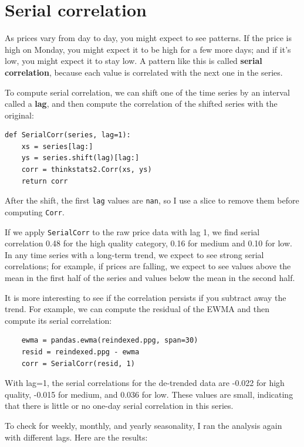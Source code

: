 \documentclass[12pt]{book}
\begin{document}
\section{Serial correlation}

As prices vary from day to day, you might expect to see patterns.
If the price is high on Monday,
you might expect it to be high for a few more days; and
if it's low, you might expect it to stay low.  A pattern
like this is called {\bf serial
correlation}, because each value is correlated with the next one
in the series.

To compute serial correlation, we can shift one of the time series
by an interval called a {\bf lag}, and then compute the correlation
of the shifted series with the original:

\begin{verbatim}
def SerialCorr(series, lag=1):
    xs = series[lag:]
    ys = series.shift(lag)[lag:]
    corr = thinkstats2.Corr(xs, ys)
    return corr
\end{verbatim}

After the shift, the first {\tt lag} values are {\tt nan}, so
I use a slice to remove them before computing {\tt Corr}.


If we apply {\tt SerialCorr} to the raw price data with lag 1, we find
serial correlation 0.48 for the high quality category, 0.16 for
medium and 0.10 for low.  In any time series with a long-term trend,
we expect to see strong serial correlations; for example, if prices
are falling, we expect to see values above the mean in the first
half of the series and values below the mean in the second half.

It is more interesting to see if the correlation persists if you
subtract away the trend.  For example, we can compute the residual
of the EWMA and then compute its serial correlation:

\begin{verbatim}
    ewma = pandas.ewma(reindexed.ppg, span=30)
    resid = reindexed.ppg - ewma
    corr = SerialCorr(resid, 1)
\end{verbatim}

With lag=1, the serial correlations for the de-trended data are
-0.022 for high quality, -0.015 for medium, and 0.036 for low.
These values are small, indicating that there is little or
no one-day serial correlation in this series.

To check for weekly, monthly, and yearly seasonality, I ran
the analysis again with different lags.  Here are the results:
\end{document}
